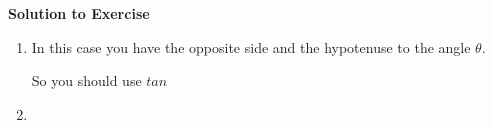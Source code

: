 {\begin{mdframed}[linewidth=4, leftmargin=40, rightmargin=40]
\begin{exercise}
\begin{figure}[H]
\begin{center}
    \end{center}
 \end{figure}       
 \par 
      \vspace{5pt}
      \label{m39408*solfhsst!!!underscore!!!id1206}\noindent\textbf{Solution to Exercise } \label{m39408*listfhsst!!!underscore!!!id1206}\begin{enumerate}[noitemsep, label=\textbf{Step} \textbf{\arabic*}. ] 
            \leftskip=20pt\rightskip=\leftskip\item  
      \label{m39408*id81396}In this case you have the opposite side and the hypotenuse to the angle \begin{math}\theta \end{math}.\par 
      \label{m39408*id81410}So you should use \begin{math}tan\end{math}\par 
      \label{m39408*id81425}\nopagebreak\noindent{}
      \item  
      \label{m39408*id81454}\nopagebreak\noindent{}\settowidth{\mymathboxwidth}{\begin{equation}

\end{equation}}
\end{enumerate}
\end{exercise}
\end{mdframed}}
